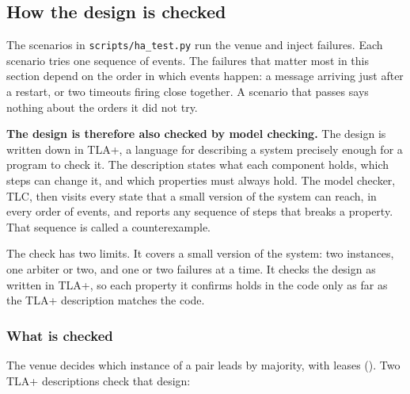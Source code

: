 \subsection{How the design is checked}
\label{sec:ha:enabled:model_checking}

The scenarios in \texttt{scripts/ha\_test.py} run the venue and inject failures.
Each scenario tries one sequence of events. The failures that matter most in this
section depend on the order in which events happen: a message arriving just
after a restart, or two timeouts firing close together. A scenario that passes
says nothing about the orders it did not try.

\textbf{The design is therefore also checked by model checking.} The design is
written down in TLA+, a language for describing a system precisely enough for a
program to check it. The description states what each component holds, which
steps can change it, and which properties must always hold. The model checker,
TLC, then visits every state that a small version of the system can reach, in
every order of events, and reports any sequence of steps that breaks a property.
That sequence is called a counterexample.

The check has two limits. It covers a small version of the system: two instances,
one arbiter or two, and one or two failures at a time. It checks the design as
written in TLA+, so each property it confirms holds in the code only as far as
the TLA+ description matches the code.

\subsubsection{What is checked}
\label{sec:ha:enabled:model_checking:scope}

The venue decides which instance of a pair leads by majority, with leases
(). Two TLA+ descriptions check that design:

